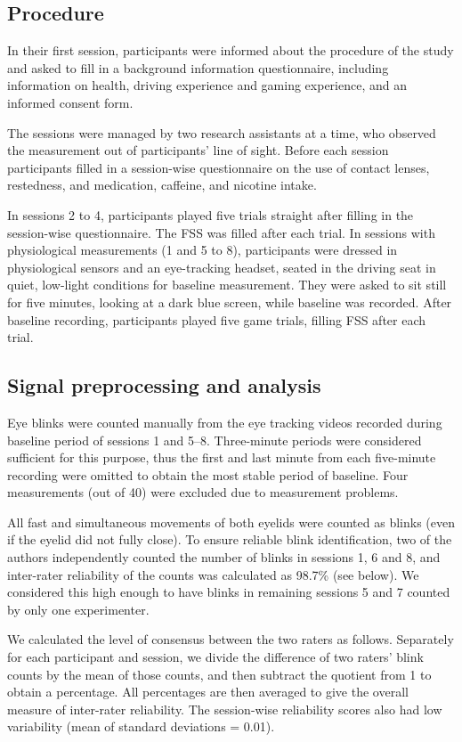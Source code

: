 \subsection*{Procedure}
In their first session, participants were informed about the procedure of the study and asked to fill in a background information questionnaire, including information on health, driving experience and gaming experience, and an informed consent form.

The sessions were managed by two research assistants at a time, who observed the measurement out of participants' line of sight. Before each session participants filled in a session-wise questionnaire on the use of contact lenses, restedness, and medication, caffeine, and nicotine intake.

In sessions 2 to 4, participants played five trials straight after filling in the session-wise questionnaire. The FSS was filled after each trial. In sessions with physiological measurements (1 and 5 to 8), participants were dressed in physiological sensors and an eye-tracking headset, seated in the driving seat in quiet, low-light conditions for baseline measurement. They were asked to sit still for five minutes, looking at a dark blue screen, while baseline was recorded. After baseline recording, participants played five game trials, filling FSS after each trial.

\subsection*{Signal preprocessing and analysis}
Eye blinks were counted manually from the eye tracking videos recorded during baseline period of sessions 1 and 5--8. Three-minute periods were considered sufficient for this purpose, thus the first and last minute from each five-minute recording were omitted to obtain the most stable period of baseline. Four measurements (out of 40) were excluded due to measurement problems.

All fast and simultaneous movements of both eyelids were counted as blinks (even if the eyelid did not fully close). To ensure reliable blink identification, two of the authors independently counted the number of blinks in sessions 1, 6 and 8, and inter-rater reliability of the counts was calculated as 98.7\% (see below). We considered this high enough to have blinks in remaining sessions 5 and 7 counted by only one experimenter.

We calculated the level of consensus between the two raters as follows. Separately for each participant and session, we divide the difference of two raters' blink counts by the mean of those counts, and then subtract the quotient from 1 to obtain a percentage. All percentages are then averaged to give the overall measure of inter-rater reliability. The session-wise reliability scores also had low variability (mean of standard deviations = 0.01).

